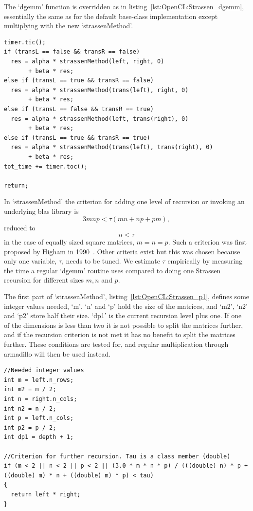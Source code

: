 The `dgemm' function is overridden as in listing~\ref{lst:OpenCL:Strassen_dgemm}, essentially the same as for the default base-class implementation except multiplying with the new `strassenMethod'.
\begin{lstlisting}[float,label={lst:OpenCL:Strassen_dgemm},caption={Strassen overrides the `dgemm' method.}]
timer.tic();
if (transL == false && transR == false)
  res = alpha * strassenMethod(left, right, 0) 
       + beta * res;
else if (transL == true && transR == false)
  res = alpha * strassenMethod(trans(left), right, 0) 
       + beta * res;
else if (transL == false && transR == true)
  res = alpha * strassenMethod(left, trans(right), 0) 
       + beta * res;
else if (transL == true && transR == true)
  res = alpha * strassenMethod(trans(left), trans(right), 0) 
  	   + beta * res;
tot_time += timer.toc();

return;
\end{lstlisting}
In `strassenMethod' the criterion for adding one level of recursion or invoking an underlying blas library is 
\begin{equation}
3 m n p < \tau \left( mn + np + pm \right),
\end{equation}
reduced to 
\begin{equation}
n < \tau
\end{equation}
in the case of equally sized square matrices, $m=n=p$.
Such a criterion was first proposed by Higham in 1990~\cite{Higham:1990:EFM:98267.98290}.
Other criteria exist but this was chosen because only one variable, $\tau$, needs to be tuned.
We estimate $\tau$ empirically by measuring the time a regular `dgemm' routine uses compared to doing one Strassen recursion for different sizes $m, n$ and $p$.


The first part of `strassenMethod', listing~\ref{lst:OpenCL:Strassen_p1}, defines some integer values needed, `m', `n' and `p' hold the size of the matrices, and `m2', `n2' and `p2' store half their size.
`dp1' is the current recursion level plus one.
If one of the dimensions is less than two it is not possible to split the matrices further, and if the recursion criterion is not met it has no benefit to split the matrices further.
These conditions are tested for, and regular multiplication through armadillo will then be used instead.
\begin{lstlisting}[float,label={lst:OpenCL:Strassen_p1},caption={Strassen p1},name={strassen_complete}]
//Needed integer values
int m = left.n_rows;
int m2 = m / 2;
int n = right.n_cols;
int n2 = n / 2;
int p = left.n_cols;
int p2 = p / 2;
int dp1 = depth + 1;

//Criterion for further recursion. Tau is a class member (double)
if (m < 2 || n < 2 || p < 2 || (3.0 * m * n * p) / (((double) n) * p + ((double) m) * n + ((double) m) * p) < tau)
{
  return left * right;
}
\end{lstlisting}


